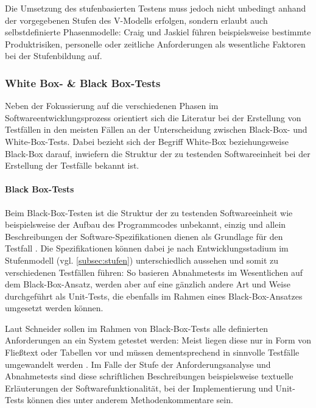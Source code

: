 Die Umsetzung des stufenbasierten Testens muss jedoch nicht unbedingt anhand der vorgegebenen Stufen des V-Modells erfolgen, sondern erlaubt auch selbstdefinierte Phasenmodelle: Craig und Jaskiel \cite[S. 98 f.]{craig2002systematic} führen beispielsweise bestimmte Produktrisiken, personelle oder zeitliche Anforderungen als wesentliche Faktoren bei der Stufenbildung auf.


\subsubsection{White Box- \& Black Box-Tests}\label{subsec:blackboxWhitebox}

Neben der Fokussierung auf die verschiedenen Phasen im Softwareentwicklungsprozess orientiert sich die Literatur bei der Erstellung von Testfällen in den meisten Fällen an der Unterscheidung zwischen Black-Box- und White-Box-Tests. Dabei bezieht sich der Begriff White-Box beziehungsweise Black-Box darauf, inwiefern die Struktur der zu testenden Softwareeinheit bei der Erstellung der Testfälle bekannt ist.

\paragraph{Black Box-Tests}

Beim Black-Box-Testen ist die Struktur der zu testenden Softwareeinheit wie beispielsweise der Aufbau des Programmcodes unbekannt, einzig und allein Beschreibungen der Software-Spezifikationen dienen als Grundlage für den Testfall \cite[S. 91]{schneider2012abenteuer}. Die Spezifikationen können dabei je nach Entwicklungsstadium im Stufenmodell (vgl. \autoref{subsec:stufen}) unterschiedlich aussehen und somit zu verschiedenen Testfällen führen: So basieren Abnahmetests im Wesentlichen auf dem Black-Box-Ansatz, werden aber auf eine gänzlich andere Art und Weise durchgeführt als Unit-Tests, die ebenfalls im Rahmen eines Black-Box-Ansatzes umgesetzt werden können.

Laut Schneider \cite[S. 91]{schneider2012abenteuer} sollen im Rahmen von Black-Box-Tests alle definierten Anforderungen an ein System getestet werden: Meist liegen diese nur in Form von Fließtext oder Tabellen vor und müssen dementsprechend in sinnvolle Testfälle umgewandelt werden \cite[S. 92]{schneider2012abenteuer}. Im Falle der Stufe der Anforderungsanalyse und Abnahmetests sind diese schriftlichen Beschreibungen beispielsweise textuelle Erläuterungen der Softwarefunktionalität, bei der Implementierung und Unit-Tests können dies unter anderem Methodenkommentare sein.

